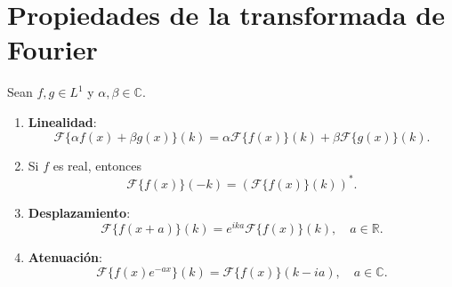 \section{Propiedades de la transformada de Fourier}

\begin{propo}
Sean $f, g \in L^1$ y $\alpha, \beta \in \mathbb{C}.$

\begin{enumerate}
    \item \textbf{Linealidad}: $$\mathcal{F}\{\alpha f(x) + \beta g(x)\}(k) = \alpha \mathcal{F}\{f(x)\}(k) + \beta \mathcal{F}\{g(x)\}(k).$$ 
    
    \item Si $f$ es real, entonces $$ \mathcal{F}\{f(x)\}(-k) = (\mathcal{F}\{f(x)\}(k))^*.$$
    
    \item \textbf{Desplazamiento}: $$\mathcal{F}\{f(x+a)\}(k) = e^{ika} \mathcal{F}\{f(x)\}(k), \quad a \in \mathbb{R}.$$
    
    \item  \textbf{Atenuación}: $$\mathcal{F}\{f(x)e^{-ax}\}(k) =  \mathcal{F}\{f(x)\}(k-ia), \quad a \in \mathbb{C}.$$
\end{enumerate}
\end{propo}

